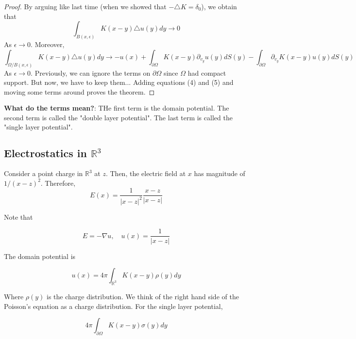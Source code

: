 \documentclass{article}
\newtheorem{one minute paper}[theorem]{One Minute Paper}
\begin{document}
\begin{proof}
    By arguing like last time (when we showed that $-\triangle K = \delta_0$), we obtain that 
    \begin{equation}
        \int_{B(x,\epsilon)}K(x-y)\triangle u(y)dy \rightarrow 0
    \end{equation}
    As $\epsilon\rightarrow 0$. Moreover, 
    \begin{equation}
        \int_{\Omega / B(x,\epsilon)}K(x-y)\triangle u(y)dy \rightarrow -u(x) + \int_{\partial \Omega}K(x-y)\partial_{v_y}u(y)dS(y) - \int_{\partial \Omega}\partial_{v_y}K(x-y)u(y)dS(y)
    \end{equation}
    As $\epsilon\rightarrow 0$. Previously, we can ignore the terms on $\partial \Omega$ since $\Omega$ had compact support. But now, we have to keep them... Adding equations (4) and (5) and moving some terms around proves the theorem.
\end{proof}

\textbf{What do the terms mean?}: THe first term is the domain potential. The second term is called the "double layer potential". The last term is called the "single layer potential". 

\subsection*{Electrostatics in $\mathbb{R}^3$}

Consider a point charge in $\mathbb{R}^3$ at $z$. Then, the electric field at $x$ has magnitude of $1/(x-z)^2$. Therefore, 
\begin{equation}
    E(x) = \frac{1}{|x-z|^2}\frac{x-z}{|x-z|}
\end{equation}

Note that 

\begin{equation}
    E = -\nabla u, \quad u(x) = \frac{1}{|x-z|}
\end{equation}

The domain potential is 

\begin{equation}
    u(x) = 4\pi \int_{\mathbb{R}^3}K(x-y)\rho(y)dy
\end{equation}

Where $\rho(y)$ is the charge distribution. We think of the right hand side of the Poisson's equation as a charge distribution. For the single layer potential, 

\begin{equation}
    4\pi \int_{\partial \Omega}K(x-y)\sigma(y)dy
\end{equation}
\end{document}
